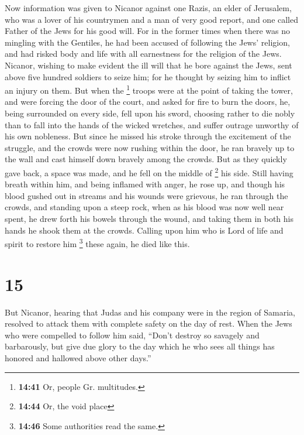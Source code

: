  Now information was given to Nicanor against one Razis,
an elder of Jerusalem, who was a lover of his countrymen and a man of
very good report, and one called Father of the Jews for his good will.
 For in the former times when there was no mingling with
the Gentiles, he had been accused of following the Jews' religion, and
had risked body and life with all earnestness for the religion of the
Jews.  Nicanor, wishing to make evident the ill will that
he bore against the Jews, sent above five hundred soldiers to seize him;
 for he thought by seizing him to inflict an injury on
them.  But when the \footnote{\textbf{14:41} Or, people
  Gr. multitudes.} troops were at the point of taking the tower, and
were forcing the door of the court, and asked for fire to burn the
doors, he, being surrounded on every side, fell upon his sword,
 choosing rather to die nobly than to fall into the hands
of the wicked wretches, and suffer outrage unworthy of his own
nobleness.  But since he missed his stroke through the
excitement of the struggle, and the crowds were now rushing within the
door, he ran bravely up to the wall and cast himself down bravely among
the crowds.  But as they quickly gave back, a space was
made, and he fell on the middle of \footnote{\textbf{14:44} Or, the void
  place} his side.  Still having breath within him, and
being inflamed with anger, he rose up, and though his blood gushed out
in streams and his wounds were grievous, he ran through the crowds, and
standing upon a steep rock,  when as his blood was now
well near spent, he drew forth his bowels through the wound, and taking
them in both his hands he shook them at the crowds. Calling upon him who
is Lord of life and spirit to restore him \footnote{\textbf{14:46} Some
  authorities read the same.} these again, he died like this.

\hypertarget{section-14}{%
\section{15}\label{section-14}}

 But Nicanor, hearing that Judas and his company were in
the region of Samaria, resolved to attack them with complete safety on
the day of rest.  When the Jews who were compelled to
follow him said, ``Don't destroy so savagely and barbarously, but give
due glory to the day which he who sees all things has honored and
hallowed above other days.''

